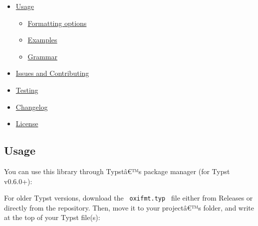 \begin{itemize}
\tightlist
\item
  \href{https://github.com/typst/packages/raw/main/packages/preview/oxifmt/0.2.1/\#usage}{Usage}

  \begin{itemize}
  \tightlist
  \item
    \href{https://github.com/typst/packages/raw/main/packages/preview/oxifmt/0.2.1/\#formatting-options}{Formatting
    options}
  \item
    \href{https://github.com/typst/packages/raw/main/packages/preview/oxifmt/0.2.1/\#examples}{Examples}
  \item
    \href{https://github.com/typst/packages/raw/main/packages/preview/oxifmt/0.2.1/\#grammar}{Grammar}
  \end{itemize}
\item
  \href{https://github.com/typst/packages/raw/main/packages/preview/oxifmt/0.2.1/\#issues-and-contributing}{Issues
  and Contributing}
\item
  \href{https://github.com/typst/packages/raw/main/packages/preview/oxifmt/0.2.1/\#testing}{Testing}
\item
  \href{https://github.com/typst/packages/raw/main/packages/preview/oxifmt/0.2.1/\#changelog}{Changelog}
\item
  \href{https://github.com/typst/packages/raw/main/packages/preview/oxifmt/0.2.1/\#license}{License}
\end{itemize}

\subsection{Usage}\label{usage}

You can use this library through Typstâ€™s package manager (for Typst
v0.6.0+):

\begin{Shaded}
\begin{Highlighting}[]
\end{Highlighting}
\end{Shaded}

For older Typst versions, download the \texttt{\ oxifmt.typ\ } file
either from Releases or directly from the repository. Then, move it to
your projectâ€™s folder, and write at the top of your Typst file(s):

\begin{Shaded}
\begin{Highlighting}[]
\end{Highlighting}
\end{Shaded}

